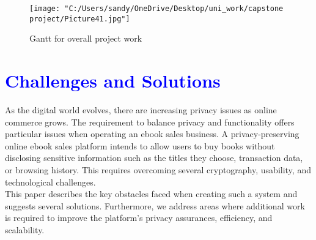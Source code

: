 \documentclass[12pt]{article}
\newcommand{\tb}{\textcolor{blue}}
\begin{document}
\pagebreak
\begin{figure}[H]
	\centering
	\texttt{[image: "C:/Users/sandy/OneDrive/Desktop/uni\_work/capstone project/Picture41.jpg"]}
	\caption{Gantt for overall project work }
	
\end{figure}
\pagebreak
\section{\tb{Challenges and Solutions}}

As the digital world evolves, there are increasing privacy issues as online commerce grows. The requirement to balance privacy and functionality offers particular issues when operating an ebook sales business. A privacy-preserving online ebook sales platform intends to allow users to buy books without disclosing sensitive information such as the titles they choose, transaction data, or browsing history. This requires overcoming several cryptography, usability, and technological challenges.\\
This paper describes the key obstacles faced when creating such a system and suggests several solutions. Furthermore, we address areas where additional work is required to improve the platform's privacy assurances, efficiency, and scalability.
\end{document}
